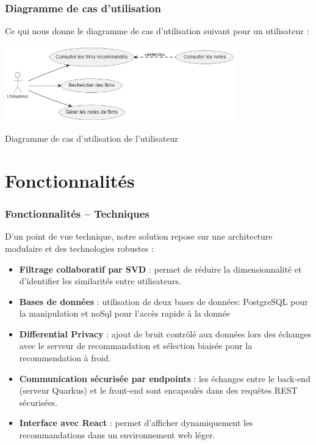 \documentclass{beamer}
\begin{document}
\begin{frame}
    \frametitle{Diagramme de cas d'utilisation}
    \vspace{0.5cm}
    Ce qui nous donne le diagramme de cas d'utilisation suivant pour un utilisateur :
    \begin{center}
        \includegraphics[width=0.75\textwidth]{uc_utilisateur.png}

        {\small Diagramme de cas d'utilisation de l'utilisateur}
    \end{center}
\end{frame}


\section{Fonctionnalités}
\begin{frame}
    \frametitle{Fonctionnalités – Techniques}
    \small
    D’un point de vue technique, notre solution repose sur une architecture modulaire et des technologies robustes :

    \begin{itemize}
        \item \textbf{Filtrage collaboratif par SVD} : permet de réduire la dimensionnalité et d’identifier les similarités entre utilisateurs.
        \item \textbf{Bases de données} : utilisation de deux bases de données: PostgreSQL pour la manipulation et noSql pour l'accès rapide à la donnée
        \item \textbf{Differential Privacy} : ajout de bruit contrôlé aux données lors des échanges avec le serveur de recommandation et sélection biaisée pour la recommendation à froid.
        \item \textbf{Communication sécurisée par endpoints} : les échanges entre le back-end (serveur Quarkus) et le front-end sont encapsulés dans des requêtes REST sécurisées.
        \item \textbf{Interface avec React} : permet d’afficher dynamiquement les recommandations dans un environnement web léger.
    \end{itemize}

\end{frame}
\end{document}
